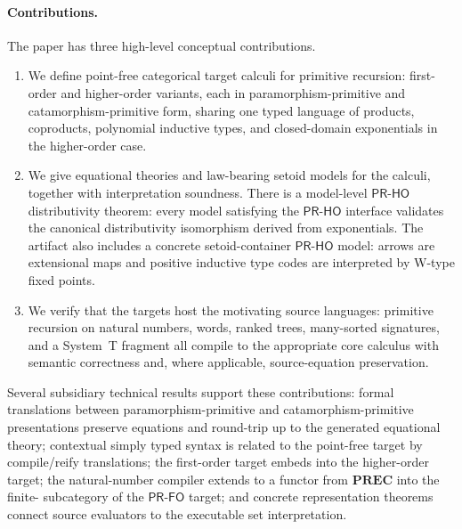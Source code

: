 \documentclass[sigplan,10pt,anonymous,review,screen]{acmart}
\newcommand{\PRFO}{\ensuremath{\mathsf{PR\mbox{-}FO}}}
\newcommand{\PRHO}{\ensuremath{\mathsf{PR\mbox{-}HO}}}
\begin{document}
\paragraph{Contributions.}
The paper has three high-level conceptual contributions.
\begin{enumerate}
\item We define point-free categorical target calculi for primitive
  recursion: first-order and higher-order variants, each in
  paramorphism-primitive and catamorphism-primitive form, sharing one typed
  language of products, coproducts, polynomial inductive types, and
  closed-domain exponentials in the higher-order case.
\item We give equational theories and law-bearing setoid models for the
  calculi, together with interpretation soundness.  There is a
  model-level \PRHO{} distributivity theorem: every model satisfying the
  \PRHO{} interface validates the canonical distributivity isomorphism
  derived from exponentials.  The artifact also includes a concrete
  setoid-container \PRHO{} model: arrows are extensional maps and
  positive inductive type codes are interpreted by W-type fixed points.
\item We verify that the targets host the motivating source languages:
  primitive recursion on natural numbers, words, ranked trees,
  many-sorted signatures, and a System~T fragment all compile to the
  appropriate core calculus with semantic correctness and, where
  applicable, source-equation preservation.
\end{enumerate}
Several subsidiary technical results support these contributions: formal
translations between paramorphism-primitive and catamorphism-primitive
presentations preserve equations and round-trip up to the generated
equational theory; contextual simply typed syntax is related to the
point-free target by compile/reify translations; the first-order target
embeds into the higher-order target; the natural-number compiler extends
to a functor from \(\mathbf{PREC}\) into the finite-
subcategory of the \PRFO{} target; and concrete representation theorems
connect source evaluators to the executable set interpretation.
\end{document}
